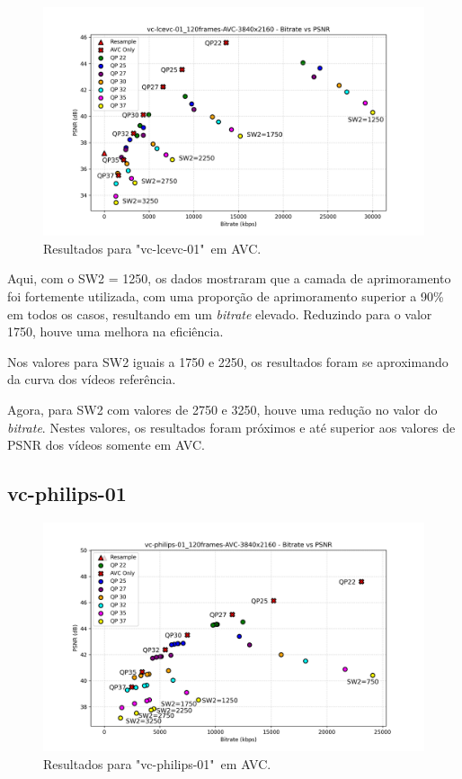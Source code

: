 \begin{figure}[h]
    \centering
    \includegraphics[width=1.0\textwidth]{img/vc-lcevc-01_120frames-AVC.png}
    \caption{Resultados para "vc-lcevc-01"\ em \acrshort{AVC}.}
    \label{fig:vc-lcevc-01}
\end{figure}

Aqui, com o SW2 = 1250, os dados mostraram que a camada de aprimoramento foi fortemente
utilizada, com uma proporção de aprimoramento superior a 90\% em todos os casos, resultando
em um \textit{bitrate} elevado. Reduzindo para o valor 1750, houve uma melhora na eficiência.

Nos valores para SW2 iguais a 1750 e 2250, os resultados foram se aproximando da curva dos
vídeos referência.

Agora, para SW2 com valores de 2750 e 3250, houve uma redução no valor do \textit{bitrate}.
Nestes valores, os resultados foram próximos e até superior aos valores de \acrshort{PSNR}
dos vídeos somente em \acrshort{AVC}.

\newpage

\subsection{vc-philips-01}

\begin{figure}[h]
    \centering
    \includegraphics[width=1.0\textwidth]{img/vc-philips-01_120frames-AVC.png}
    \caption{Resultados para "vc-philips-01"\ em \acrshort{AVC}.}
    \label{fig:vc-philips-01}
\end{figure}

